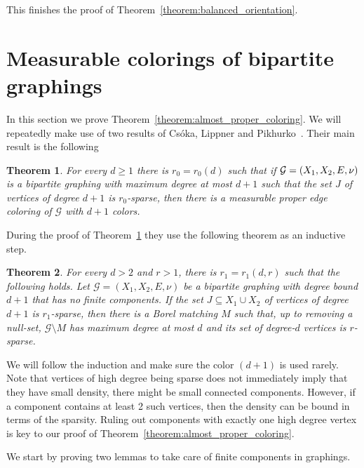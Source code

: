\documentclass[11pt]{article}
\newtheorem{theo}{Theorem}[section]
\theoremstyle{definition}
\numberwithin{equation}{section}
\numberwithin{figure}{section}
\numberwithin{table}{section}
\newcommand{\G}{\mathcal{G}}
\begin{document}

This finishes the proof of Theorem~\ref{theorem:balanced_orientation}.

\section{Measurable colorings of bipartite graphings} \label{section:coloring}

In this section we prove Theorem~\ref{theorem:almost_proper_coloring}. We will repeatedly make use of two results of Csóka, Lippner and Pikhurko~\cite[Theorems~1.9 and 4.2]{csoka2016kHonig}. Their main result is the following

\begin{theo}\label{theorem:CSLP_main}
For every $d \geq 1$ there is $r_0 = r_0(d)$ such that if $\G = (X_1, X_2,E,\linebreak\nu)$ is a bipartite graphing with maximum degree at most $d + 1$ such that the set $J$ of vertices of degree $d + 1$ is $r_0$-sparse, then there is a measurable proper edge coloring of $\G$ with $d+1$ colors.
\end{theo}

During the proof of Theorem~\ref{theorem:CSLP_main} they use the following theorem as an inductive step.

\begin{theo}\label{theorem:CSLP_induction}
For every $d > 2$ and $r > 1$, there is $r_1 = r_1(d, r)$ such that the following holds. Let $\G = (X_1,X_2, E, \nu)$ be a bipartite graphing with degree bound $d + 1$ that has no finite components. If the set $J \subseteq X_1 \cup X_2$ of vertices of degree $d + 1$ is $r_1$-sparse, then there is a Borel matching $M$ such that, up to removing a null-set, $\G \setminus M$ has maximum degree at most $d$ and its set of degree-$d$ vertices is $r$-sparse.
\end{theo}

We will follow the induction and make sure the color $(d+1)$ is used rarely. Note that vertices of high degree being sparse does not immediately imply that they have small density, there might be small connected components. However, if a component contains at least 2 such vertices, then the density can be bound in terms of the sparsity. Ruling out components with exactly one high degree vertex is key to our proof of Theorem~\ref{theorem:almost_proper_coloring}.

We start by proving two lemmas to take care of finite components in graphings.
\end{document}
